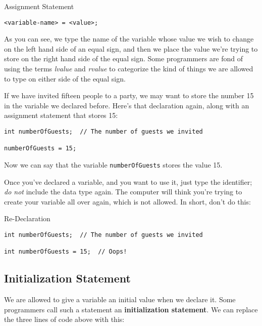 \begin{javaformat}{Assignment Statement}
\begin{verbatim}
<variable-name> = <value>;
\end{verbatim}
\end{javaformat}

As you can see, we type the name of the variable whose value we wish to change on the left hand side of an equal sign, and then we place the value we're trying to store on the right hand side of the equal sign.  Some programmers are fond of using the terms \textit{lvalue} and \textit{rvalue} to categorize the kind of things we are allowed to type on either side of the equal sign.

If we have invited fifteen people to a party, we may want to store the number 15 in the variable we declared before.  Here's that declaration again, along with an assignment statement that stores 15:

\begin{verbatim}
int numberOfGuests;  // The number of guests we invited

numberOfGuests = 15;
\end{verbatim}

Now we can say that the variable \lstinline{numberOfGuests} stores the value 15.

Once you've declared a variable, and you want to use it, just type the identifier; \textit{do not} include the data type again.  The computer will think you're trying to create your variable all over again, which is not allowed.  In short, don't do this:

\begin{trap}{Re-Declaration}
\begin{verbatim}
int numberOfGuests;  // The number of guests we invited

int numberOfGuests = 15;  // Oops!
\end{verbatim}
\end{trap}

\subsection{Initialization Statement}

We are allowed to give a variable an initial value when we declare it.  Some programmers call such a statement an \textbf{initialization statement}.  We can replace the three lines of code above with this:

